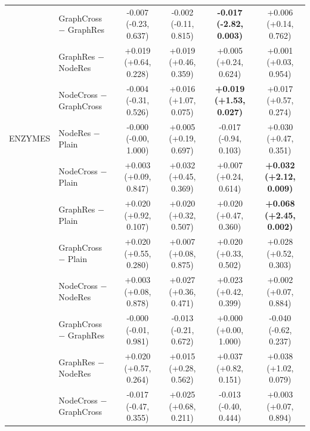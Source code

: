 \begin{table}[t]
\begin{tabular}{llcccc}
 & GraphCross $-$ GraphRes & -0.007 (-0.23, 0.637) & -0.002 (-0.11, 0.815) & \textbf{-0.017 (-2.82, 0.003)} & +0.006 (+0.14, 0.762) \\
 & GraphRes $-$ NodeRes & +0.019 (+0.64, 0.228) & +0.019 (+0.46, 0.359) & +0.005 (+0.24, 0.624) & +0.001 (+0.03, 0.954) \\
 & NodeCross $-$ GraphCross & -0.004 (-0.31, 0.526) & +0.016 (+1.07, 0.075) & \textbf{+0.019 (+1.53, 0.027)} & +0.017 (+0.57, 0.274) \\
\midrule
ENZYMES & NodeRes $-$ Plain & -0.000 (-0.00, 1.000) & +0.005 (+0.19, 0.697) & -0.017 (-0.94, 0.103) & +0.030 (+0.47, 0.351) \\
 & NodeCross $-$ Plain & +0.003 (+0.09, 0.847) & +0.032 (+0.45, 0.369) & +0.007 (+0.24, 0.614) & \textbf{+0.032 (+2.12, 0.009)} \\
 & GraphRes $-$ Plain & +0.020 (+0.92, 0.107) & +0.020 (+0.32, 0.507) & +0.020 (+0.47, 0.360) & \textbf{+0.068 (+2.45, 0.002)} \\
 & GraphCross $-$ Plain & +0.020 (+0.55, 0.280) & +0.007 (+0.08, 0.875) & +0.020 (+0.33, 0.502) & +0.028 (+0.52, 0.303) \\
 & NodeCross $-$ NodeRes & +0.003 (+0.08, 0.878) & +0.027 (+0.36, 0.471) & +0.023 (+0.42, 0.399) & +0.002 (+0.07, 0.884) \\
 & GraphCross $-$ GraphRes & -0.000 (-0.01, 0.981) & -0.013 (-0.21, 0.672) & +0.000 (+0.00, 1.000) & -0.040 (-0.62, 0.237) \\
 & GraphRes $-$ NodeRes & +0.020 (+0.57, 0.264) & +0.015 (+0.28, 0.562) & +0.037 (+0.82, 0.151) & +0.038 (+1.02, 0.079) \\
 & NodeCross $-$ GraphCross & -0.017 (-0.47, 0.355) & +0.025 (+0.68, 0.211) & -0.013 (-0.40, 0.444) & +0.003 (+0.07, 0.894) \\
\bottomrule
\end{tabular}
\end{table}
